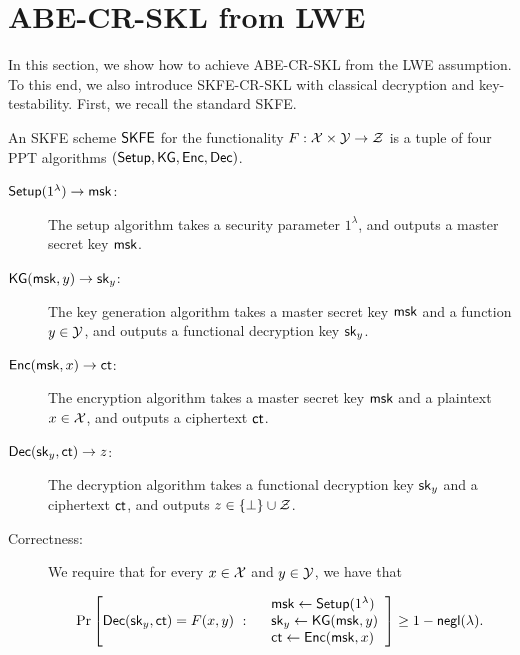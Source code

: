
\newcommand{\decryptable}{\mathsf{decryptable}}
\newcommand{\undecryptable}{\mathsf{undecryptable}}


\section{ABE-CR-SKL from LWE}\label{sec:ABE-SKL}
In this section, we show how to achieve ABE-CR-SKL from the LWE assumption.
To this end, we also introduce SKFE-CR-SKL with classical decryption and key-testability.
First, we recall the standard SKFE.

\begin{definition}\label{def:SKFE}
An SKFE scheme $\mathsf{SKFE}$ for the functionality $F: \mathcal{X} \times
\mathcal{Y} \rightarrow \mathcal{Z}$ is a tuple of four PPT algorithms $(\mathsf{Setup}, \mathsf{KG}, \mathsf{Enc}, \mathsf{Dec})$. 
\begin{description}
\item[$\mathsf{Setup}(1^\lambda)\rightarrow\mathsf{msk}$:] The setup algorithm takes a security parameter $1^\lambda$, and outputs a master secret key $\mathsf{msk}$.
\item[$\mathsf{KG}(\mathsf{msk},y)\rightarrow\mathsf{sk}_y$:] The key generation algorithm takes a master secret key $\mathsf{msk}$ and a function $y \in \mathcal{Y}$, and outputs a functional decryption key $\mathsf{sk}_y$.


\item[$\mathsf{Enc}(\mathsf{msk},x)\rightarrow\mathsf{ct}$:] The encryption algorithm takes a master secret key $\mathsf{msk}$ and a plaintext $x \in \mathcal{X}$, and outputs a ciphertext $\mathsf{ct}$.

\item[$\mathsf{Dec}(\mathsf{sk}_y,\mathsf{ct})\rightarrow z$:] The decryption algorithm takes a
functional decryption key $\mathsf{sk}_y$ and a ciphertext $\mathsf{ct}$, and
outputs  $z \in \{ \bot \} \cup \mathcal{Z}$.

\item[Correctness:] We require that for every $x \in \mathcal{X}$ and $y\in\mathcal{Y}$, we have that

\[
\Pr\left[
\mathsf{Dec}(\mathsf{sk}_y, \mathsf{ct}) = F(x,y)
 \ :
\begin{array}{rl}
 &\mathsf{msk} \leftarrow \mathsf{Setup}(1^\lambda)\\
 & \mathsf{sk}_y \leftarrow \mathsf{KG}(\mathsf{msk},y) \\
 &\mathsf{ct} \leftarrow \mathsf{Enc}(\mathsf{msk},x)
\end{array}
\right] \ge 1 - {\mathsf{negl}}(\lambda).
\]
\end{description}
\end{definition}




